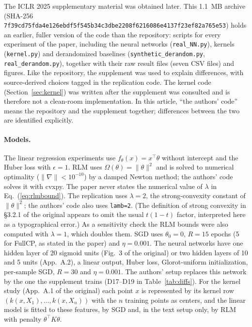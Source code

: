 The ICLR 2025 supplementary material\supercite{leezhang2025supp} was obtained later. This 1.1~MB archive (SHA-256 \texttt{7f39cd75\allowbreak fda4e126\allowbreak ebdf5f54\allowbreak 5b34c3db\allowbreak e2208f62\allowbreak 16086e41\allowbreak 37f23ef8\allowbreak 2a765e53}) holds an earlier, fuller version of the code than the repository: scripts for every experiment of the paper, including the neural networks (\texttt{real\_NN.py}), kernels (\texttt{kernel.py}) and derandomized baselines (\texttt{synthetic\_derandom.py}, \texttt{real\_derandom.py}), together with their raw result files (seven CSV files) and figures. Like the repository, the supplement was used to explain differences, with source-derived choices tagged in the replication code. The kernel code (Section~\ref{sec:kernel}) was written after the supplement was consulted and is therefore not a clean-room implementation. In this article, ``the authors' code'' means the repository and the supplement together; differences between the two are identified explicitly.

\paragraph{Models.} The linear regression experiments use $f_\theta(x)=x^\top\theta$ without intercept and the Huber loss
with $\epsilon=1$. RLM uses $\Omega(\theta)=\|\theta\|^2$ and is solved to numerical optimality
($\|\nabla\|<10^{-10}$) by a damped Newton method; the authors' code solves it with cvxpy\supercite{diamond2016cvxpy}.
The paper never states the numerical value of $\lambda$ in Eq.~(\ref{eq:rlmbound}). The replication uses $\lambda=2$, the
strong-convexity constant of $\|\theta\|^2$; the authors' code also uses \texttt{lamb=2}. (The definition of
strong convexity in §3.2.1 of the original appears to omit the usual $t(1-t)$ factor, interpreted here as a typographical error.) As a
sensitivity check the RLM bounds were also computed with $\lambda=1$, which doubles them. SGD uses
$\theta_0=0$, $R=15$ epochs (5 for FullCP, as stated in the paper) and $\eta=0.001$. The neural networks have one
hidden layer of 20 sigmoid units (Fig.~3 of the original) or two hidden layers of 10 and 5 units (App.~A.2), a linear
output, Huber loss, Glorot-uniform initialization, per-sample SGD, $R=30$ and $\eta=0.001$. The authors' setup
replaces this network by the one the supplement trains (D17--D19 in Table~\ref{tab:diffs}). For the kernel study
(App.~A.1 of the original) each point $x$ is represented by its kernel row $(k(x,X_1),\dots,k(x,X_n))$ with the $n$
training points as centers, and the linear model is fitted to these features, by SGD and, in the text setup only, by
RLM with penalty $\theta^\top K\theta$.

